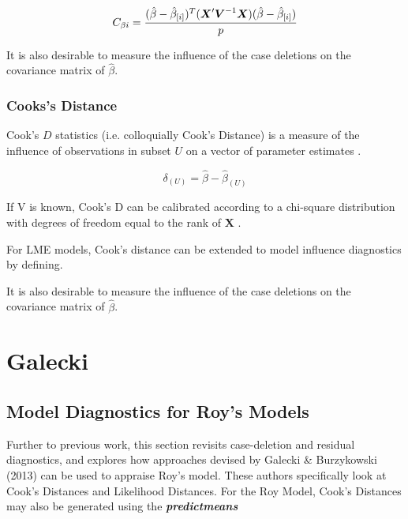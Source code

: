\documentclass[12pt, a4paper]{report}
\theoremstyle{plain}
\theoremstyle{definition}
\theoremstyle{remark}
\begin{document}
\[ C_{\beta i} = {(\hat{\beta} - \hat{\beta}_{[i]})^{T}(\boldsymbol{X}^{\prime}\boldsymbol{V}^{-1}\boldsymbol{X}) (\hat{\beta} - \hat{\beta}_{[i]}) \over p}\]

It is also desirable to measure the influence of the case deletions on the covariance matrix of $\hat{\beta}$.







\subsection{Cooks's Distance}%
 Cook's $D$ statistics (i.e. colloquially Cook's Distance) is a measure of the influence of observations in subset $U$ on a vector of parameter estimates \citep{cook77}.

\[ \delta_{(U)} = \hat{\beta} - \hat{\beta}_{(U)}\]

If V is known, Cook's D can be calibrated according to a chi-square distribution with degrees of freedom equal to the rank of $\boldsymbol{X}$ \citep{cpj92}.


For LME models, Cook's distance can be extended to model influence diagnostics by defining.


It is also desirable to measure the influence of the case deletions on the covariance matrix of $\hat{\beta}$.

\newpage




\chapter{Galecki}
\section{Model Diagnostics for Roy's Models}

Further to previous work, this section revisits case-deletion and residual diagnostics, and explores how approaches devised by  Galecki \& Burzykowski (2013) can be used to appraise Roy's model. These authors specifically look at Cook's Distances and Likelihood Distances.
For the Roy Model, Cook's Distances may also be generated using the \textbf{\textit{predictmeans}}
\end{document}
